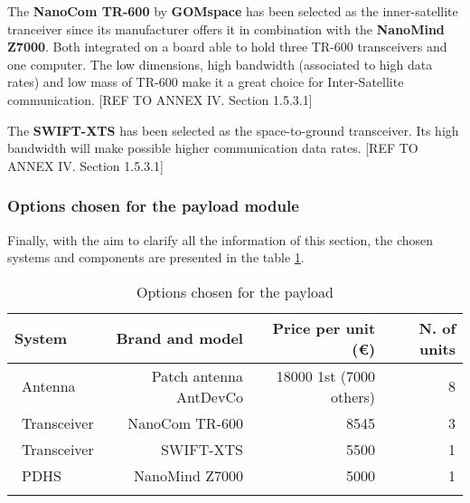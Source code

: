 The \textbf{NanoCom TR-600} by \textbf{GOMspace} has been selected as the inner-satellite tranceiver since its manufacturer offers it in combination with the \textbf{NanoMind Z7000}. Both integrated on a board able to hold three TR-600 transceivers and one computer. The low dimensions, high bandwidth (associated to high data rates) and low mass of TR-600 make it a great choice for Inter-Satellite communication. [{REF TO ANNEX IV. Section 1.5.3.1}]

The \textbf{SWIFT-XTS} has been selected as the space-to-ground transceiver. Its high bandwidth will make possible higher communication data rates. [{REF TO ANNEX IV. Section 1.5.3.1}]

\subsubsection{Options chosen for the payload module}

Finally, with the aim to clarify all the information of this section, the chosen systems and components are presented in the table \ref{payloadchosen}.

\begin{longtable}{| l | r | r | r |}
	\hline
	\rowcolor[gray]{0.80}	\textbf{System} &  \textbf{Brand and model}     & \textbf{Price per unit (\euro)} & \textbf{N. of units}  \\
	\hline
	\endfirsthead
	
	~Antenna & Patch antenna AntDevCo & 18000 1st (7000 others) & 8 \\
	~Transceiver & NanoCom TR-600 & 8545 & 3 \\
	~Transceiver & SWIFT-XTS & 5500 &1\\
	~PDHS & NanoMind Z7000 & 5000 & 1 \\
	\hline
	
\caption{Options chosen for the payload}
\label{payloadchosen}
\end{longtable}
